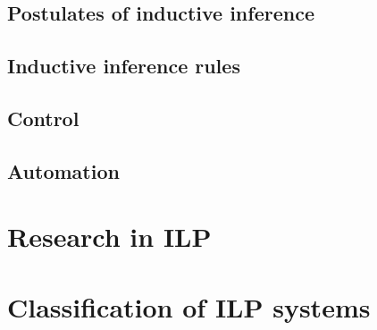 \subsection{Postulates of inductive inference}
\subsection{Inductive inference rules}
\subsection{Control}
\subsection{Automation}
\section{Research in ILP}
\section{Classification of ILP systems}